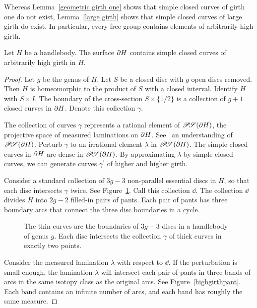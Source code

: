 Whereas Lemma~\ref{geometric girth one} shows that simple closed curves of girth one do not exist, Lemma~\ref{large girth} shows that simple closed curves of large girth do exist.  In particular, every free group contains elements of arbitrarily high girth.  

\begin{lemma}
\label{large girth}
Let $H$ be a handlebody.  The surface $\partial H$ contains simple closed
curves of arbitrarily high girth in $H$.
\end{lemma}

\begin{proof}
Let $g$ be the genus of $H$.  Let $S$ be a closed disc with $g$ open discs removed.  Then $H$ is homeomorphic to the product of $S$ with a closed
interval.  Identify $H$ with $S\times I$.  The boundary of the cross-section $S\times\{1/2\}$ is a collection of $g+1$ closed curves in $\partial H$.  Denote this collection $\gamma$. 

The collection of curves $\gamma$ represents a rational element of $\mathscr{P\!S}(\partial H)$, the projective space of measured laminations on $\partial H$.  See~\cite{Thu2} an understanding of $\mathscr{P\!S}(\partial H)$.  Perturb $\gamma$ to an irrational element $\lambda$ in $\mathscr{P\!S}(\partial H)$.  The simple closed curves in $\partial H$ are dense in $\mathscr{P\!S}(\partial H)$.  By approximating $\lambda$ by simple closed curves, we can generate curves $\gamma^\prime$ of higher and higher girth.

Consider a standard collection of $3g-3$ non-parallel essential discs in $H$, so that each disc intersects $\gamma$ twice.  See Figure~\ref{highgirth}.  Call this collection $\dd$.  The collection $\dd$ divides $H$ into $2g-2$ filled-in pairs of pants.  Each pair of pants has three boundary arcs that connect the three disc boundaries in a cycle.

\begin{figure}
\caption{
The thin curves are the boundaries of $3g-3$ discs in a handlebody of genus $g$.  Each disc intersects the collection $\gamma$ of thick curves in exactly two points.
}
\label{highgirth}
\end{figure}

Consider the measured lamination $\lambda$ with respect to $\dd$.
If the perturbation is small enough, the lamination 
$\lambda$ will intersect each pair of pants in three bands of arcs 
in the same isotopy class as the original arcs.  See 
Figure~\ref{highgirthpant}.  Each band contains an infinite number 
of arcs, and each band has roughly the same measure.  


\end{proof}
